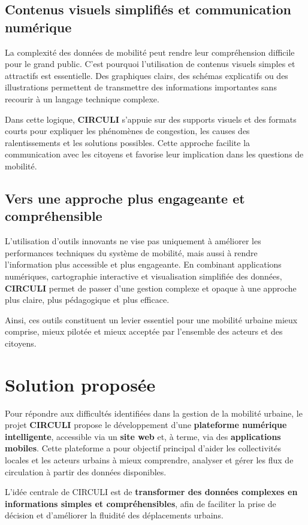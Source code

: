 \subsection{Contenus visuels simplifiés et communication numérique}
La complexité des données de mobilité peut rendre leur compréhension difficile pour le grand public. C'est pourquoi l'utilisation de contenus visuels simples et attractifs est essentielle. Des graphiques clairs, des schémas explicatifs ou des illustrations permettent de transmettre des informations importantes sans recourir à un langage technique complexe.

Dans cette logique, \textbf{CIRCULI} s'appuie sur des supports visuels et des formats courts pour expliquer les phénomènes de congestion, les causes des ralentissements et les solutions possibles. Cette approche facilite la communication avec les citoyens et favorise leur implication dans les questions de mobilité.

\subsection{Vers une approche plus engageante et compréhensible}
L'utilisation d'outils innovants ne vise pas uniquement à améliorer les performances techniques du système de mobilité, mais aussi à rendre l'information plus accessible et plus engageante. En combinant applications numériques, cartographie interactive et visualisation simplifiée des données, \textbf{CIRCULI} permet de passer d'une gestion complexe et opaque à une approche plus claire, plus pédagogique et plus efficace.

Ainsi, ces outils constituent un levier essentiel pour une mobilité urbaine mieux comprise, mieux pilotée et mieux acceptée par l'ensemble des acteurs et des citoyens.

\section{Solution proposée}
Pour répondre aux difficultés identifiées dans la gestion de la mobilité urbaine, le projet \textbf{CIRCULI} propose le développement d'une \textbf{plateforme numérique intelligente}, accessible via un \textbf{site web} et, à terme, via des \textbf{applications mobiles}. Cette plateforme a pour objectif principal d'aider les collectivités locales et les acteurs urbains à mieux comprendre, analyser et gérer les flux de circulation à partir des données disponibles.

L'idée centrale de CIRCULI est de \textbf{transformer des données complexes en informations simples et compréhensibles}, afin de faciliter la prise de décision et d'améliorer la fluidité des déplacements urbains.

